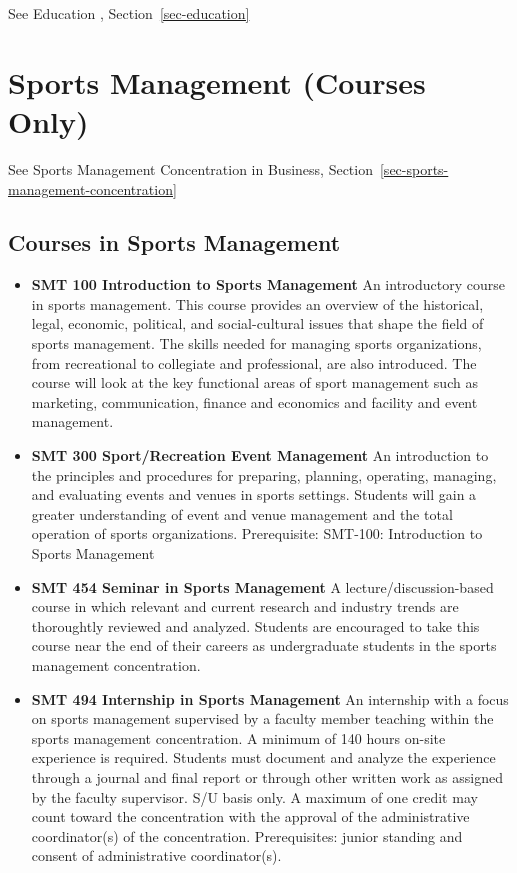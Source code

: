 \documentclass[
  letterpaper,
]{scrbook}
\providecommand{\tightlist}{%
  \setlength{\itemsep}{0pt}\setlength{\parskip}{0pt}}
\begin{document}
See Education , Section~\ref{sec-education}

\section{Sports Management (Courses
Only)}\label{sports-management-courses-only}

See Sports Management Concentration in Business,
Section~\ref{sec-sports-management-concentration}

\subsection{Courses in Sports
Management}\label{courses-in-sports-management}

\begin{itemize}
\tightlist
\item
  \textbf{SMT 100 Introduction to Sports Management} An introductory
  course in sports management. This course provides an overview of the
  historical, legal, economic, political, and social-cultural issues
  that shape the field of sports management. The skills needed for
  managing sports organizations, from recreational to collegiate and
  professional, are also introduced. The course will look at the key
  functional areas of sport management such as marketing, communication,
  finance and economics and facility and event management.\\
\item
  \textbf{SMT 300 Sport/Recreation Event Management} An introduction to
  the principles and procedures for preparing, planning, operating,
  managing, and evaluating events and venues in sports settings.
  Students will gain a greater understanding of event and venue
  management and the total operation of sports organizations.
  Prerequisite: SMT-100: Introduction to Sports Management
\item
  \textbf{SMT 454 Seminar in Sports Management} A
  lecture/discussion-based course in which relevant and current research
  and industry trends are thoroughtly reviewed and analyzed. Students
  are encouraged to take this course near the end of their careers as
  undergraduate students in the sports management concentration.
\item
  \textbf{SMT 494 Internship in Sports Management} An internship with a
  focus on sports management supervised by a faculty member teaching
  within the sports management concentration. A minimum of 140 hours
  on-site experience is required. Students must document and analyze the
  experience through a journal and final report or through other written
  work as assigned by the faculty supervisor. S/U basis only. A maximum
  of one credit may count toward the concentration with the approval of
  the administrative coordinator(s) of the concentration. Prerequisites:
  junior standing and consent of administrative coordinator(s).
\end{itemize}
\end{document}
